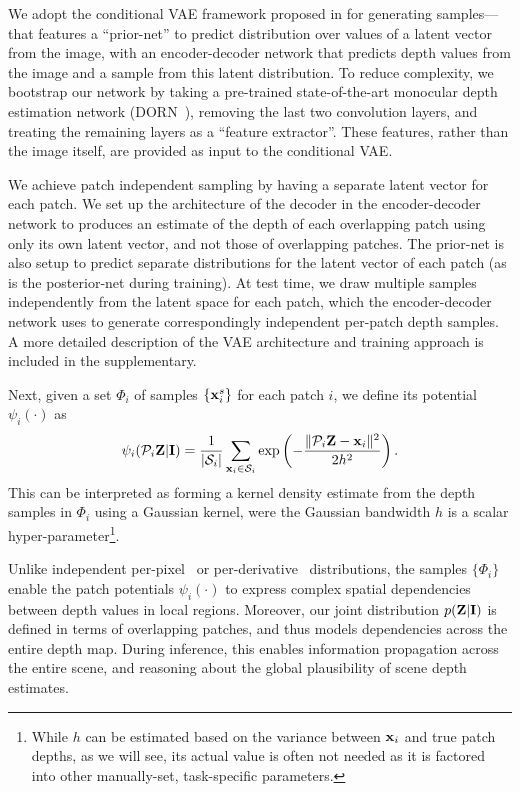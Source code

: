 \documentclass[10pt,twocolumn,letterpaper]{article}
\begin{document}
We adopt the conditional VAE framework proposed in \cite{condVAE} for generating samples---that features a ``prior-net'' to predict distribution over values of a latent vector from the image, with an encoder-decoder network that predicts depth values from the image and a sample from this latent distribution. To reduce complexity, we bootstrap our network by taking a pre-trained state-of-the-art monocular depth estimation network (DORN~\cite{fu2018deep}), removing the last two convolution layers, and treating the remaining layers as a ``feature extractor''. These features, rather than the image itself, are provided as input to the conditional VAE.

We achieve patch independent sampling by having a separate latent vector for each patch. We set up the architecture of the decoder in the encoder-decoder network to produces an estimate of the depth of each overlapping patch using only its own latent vector,  and not those of overlapping patches. The prior-net is also setup to predict separate distributions for the latent vector of each patch (as is the posterior-net during training). At test time, we draw multiple samples independently from the latent space for each patch, which the encoder-decoder network uses to generate correspondingly independent per-patch depth samples. A more detailed description of the VAE architecture and training approach is included in the supplementary. 

 Next, given a set $\Phi_i$ of samples $\{\mathbf{x}{}_i^s\}$ for each patch $i$, we define its potential $\psi_i(\cdot)$ as
\begin{equation}
  \label{eq:potdef}
  \psi_i(\mathcal{P}_i{}\mathbf{Z}|\mathbf{I}) = \frac{1}{|\mathcal{S}_i|} \sum_{\mathbf{x}{}_i \in \mathcal{S}_i} \exp\left(-\frac{\|\mathcal{P}_i{}\mathbf{Z} - \mathbf{x}{}_i\|^2}{2h^2}\right).
\end{equation}
This can be interpreted as forming a kernel density estimate from the depth samples in $\Phi_i$ using a Gaussian kernel, were the Gaussian bandwidth $h$ is a scalar hyper-parameter\footnote{While $h$ can be estimated based on the variance between $\mathbf{x}{}_i$ and true patch depths, as we will see, its actual value is often not needed as it is factored into other manually-set, task-specific parameters.}.

Unlike independent per-pixel~\cite{kendall2017uncertainties,heo2018monocular,liu2019neural} or per-derivative~\cite{chakrabarti2016depth} distributions, the samples $\{\Phi_i\}$ enable the patch potentials $\psi_i(\cdot)$ to express complex spatial dependencies between depth values in local regions. Moreover, our joint distribution $p(\mathbf{Z}|\mathbf{I})$ is defined in terms of overlapping patches, and thus models dependencies across the entire depth map. During inference, this enables information propagation across the entire scene, and reasoning about the global plausibility of scene depth estimates. 
\end{document}
